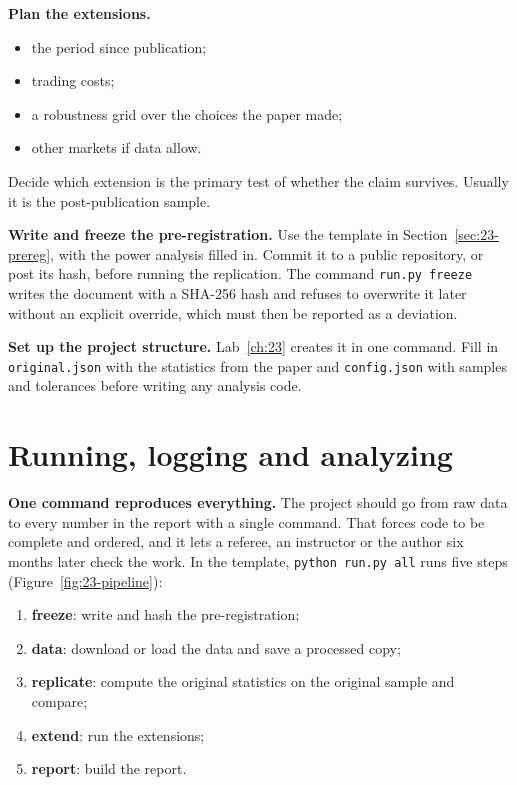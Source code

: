 \textbf{Plan the extensions.}

\begin{itemize}
  \item the period since publication;
  \item trading costs;
  \item a robustness grid over the choices the paper made;
  \item other markets if data allow.
\end{itemize}

Decide which extension is the primary test of whether the claim survives. Usually it is the post-publication sample.

\textbf{Write and freeze the pre-registration.} Use the template in Section~\ref{sec:23-prereg}, with the power analysis filled in. Commit it to a public repository, or post its hash, before running the replication. The command \texttt{run.py freeze} writes the document with a SHA-256 hash and refuses to overwrite it later without an explicit override, which must then be reported as a deviation.

{\sloppy \textbf{Set up the project structure.} Lab~\ref{ch:23} creates it in one command. Fill in \texttt{original.json} with the statistics from the paper and \texttt{config.json} with samples and tolerances before writing any analysis code.\par}

\section{Running, logging and analyzing}
\label{sec:23-running}

\textbf{One command reproduces everything.} The project should go from raw data to every number in the report with a single command. That forces code to be complete and ordered, and it lets a referee, an instructor or the author six months later check the work. In the template, \texttt{python run.py all} runs five steps (Figure~\ref{fig:23-pipeline}):

\begin{enumerate}
  \item \textbf{freeze}: write and hash the pre-registration;
  \item \textbf{data}: download or load the data and save a processed copy;
  \item \textbf{replicate}: compute the original statistics on the original sample and compare;
  \item \textbf{extend}: run the extensions;
  \item \textbf{report}: build the report.
\end{enumerate}

